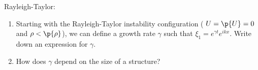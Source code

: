 
 Rayleigh-Taylor:  
   \begin{enumerate}

   \item {} Starting with the Rayleigh-Taylor instability configuration (
   $U=\p{U}=0$ and $\rho<\p{\rho}$),  we
     can define a growth rate $\gamma$ such that $\xi_1= e^{\gamma t} e^{i k x}$.  Write down an
     expression for $\gamma$.  
   \item {} How does $\gamma$ depend on the size of a structure? 
   \end{enumerate}

